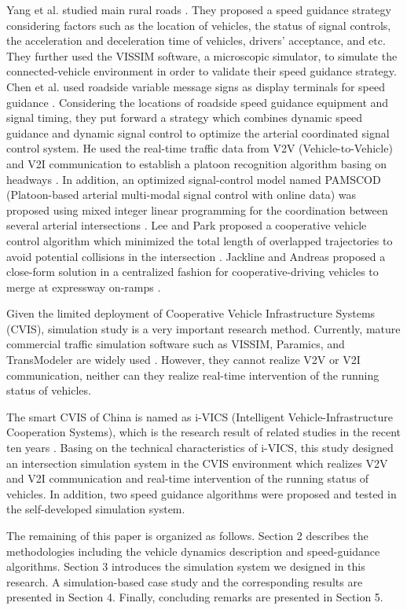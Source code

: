\documentclass[10.5pt,compsoc]{TsT}
\theoremstyle{mystyle}
\newcommand{\upcite}[1]{\textsuperscript{\cite{#1}}}
\begin{document}
{Yang et al. studied main rural roads \upcite{10}. They
proposed a speed guidance strategy considering factors such as the
location of vehicles, the status of signal controls, the acceleration
and deceleration time of vehicles, drivers' acceptance, and etc. They
further used the VISSIM software, a microscopic simulator, to simulate
the connected-vehicle environment in order to validate their speed
guidance strategy. Chen et al. used roadside variable message signs as
display terminals for speed guidance \upcite{11}.
Considering the locations of roadside speed guidance equipment and
signal timing, they put forward a strategy which combines dynamic speed
guidance and dynamic signal control to optimize the arterial coordinated
signal control system. He used the real-time traffic data from V2V
(Vehicle-to-Vehicle) and V2I communication to establish a platoon
recognition algorithm basing on headways \upcite{12}. In
addition, an optimized signal-control model named PAMSCOD (Platoon-based
arterial multi-modal signal control with online data) was proposed using
mixed integer linear programming for the coordination between several
arterial intersections \upcite{12}. Lee and Park proposed
a cooperative vehicle control algorithm which minimized the total length
of overlapped trajectories to avoid potential collisions in the
intersection \upcite{13}. Jackline and Andreas proposed a
close-form solution in a centralized fashion for cooperative-driving
vehicles to merge at expressway on-ramps \upcite{14}.

Given the limited deployment of Cooperative Vehicle Infrastructure
Systems (CVIS), simulation study is a very important research method.
Currently, mature commercial traffic simulation software such as VISSIM,
Paramics, and TransModeler are widely used \upcite{15}.
However, they cannot realize V2V or V2I communication, neither can they
realize real-time intervention of the running status of vehicles.

The smart CVIS of China is named as i-VICS (Intelligent
Vehicle-Infrastructure Cooperation Systems), which is the research
result of related studies in the recent ten years
\upcite{16,17,18}. Basing on the technical characteristics
of i-VICS, this study designed an intersection simulation system in the
CVIS environment which realizes V2V and V2I communication and real-time
intervention of the running status of vehicles. In addition, two speed
guidance algorithms were proposed and tested in the self-developed
simulation system.

The remaining of this paper is organized as follows. Section 2 describes
the methodologies including the vehicle dynamics description and
speed-guidance algorithms. Section 3 introduces the simulation system we
designed in this research. A simulation-based case study and the
corresponding results are presented in Section 4. Finally, concluding
remarks are presented in Section 5.

}
\end{document}
